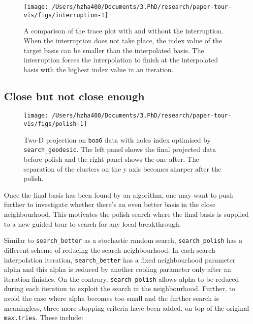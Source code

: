 \documentclass[12pt]{article}
\begin{document}
\begin{figure}

{\centering \texttt{[image: /Users/hzha400/Documents/3.PhD/research/paper-tour-vis/figs/interruption-1]} 

}

\caption{A comparison of the trace plot with and without the interruption. When the interruption does not take place, the index value of the target basis can be smaller than the interpolated basis. The interruption forces the interpolation to finish at the interpolated basis with the highest index value in an iteration.}\label{fig:interruption}
\end{figure}



\hypertarget{close-but-not-close-enough}{%
\subsection{Close but not close enough}\label{close-but-not-close-enough}}

\begin{figure}

{\centering \texttt{[image: /Users/hzha400/Documents/3.PhD/research/paper-tour-vis/figs/polish-1]} 

}

\caption{Two-D projection on \texttt{boa6} data with holes index optimised by \texttt{search\_geodesic}. The left panel shows the final projected data before polish and the right panel shows the one after. The separation of the clusters on the y axis becomes sharper after the polish.}\label{fig:polish}
\end{figure}



Once the final basis has been found by an algorithm, one may want to push further to investigate whether there's an even better basis in the close neighbourhood. This motivates the polish search where the final basis is supplied to a new guided tour to search for any local breakthrough.

Similar to \texttt{search\_better} as a stochastic random search, \texttt{search\_polish} has a different scheme of reducing the search neighbourhood. In each search-interpolation iteration, \texttt{search\_better} has a fixed neighbourhood parameter alpha and this alpha is reduced by another cooling parameter only after an iteration finishes. On the contrary, \texttt{search\_polish} allows alpha to be reduced during each iteration to exploit the search in the neighbourhood. Further, to avoid the case where alpha becomes too small and the further search is meaningless, three more stopping criteria have been added, on top of the original \texttt{max.tries}. These include:
\end{document}
